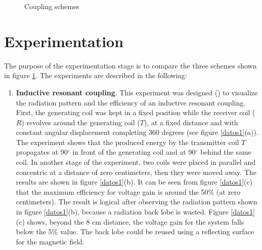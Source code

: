 \documentclass{intech}
\begin{document}
{\begin{figure}[htbp]	%
\centering
{} %
\hspace{0.5cm}
\hspace{0.5cm}
\vspace{-0.5cm}
\caption{Coupling schemes}
\label{fuerte}
\end{figure}

\section{Experimentation}
The purpose of the experimentation stage is to compare the three schemes shown in figure \ref{fuerte}. The experiments are described in the following:
\vspace{-0.3cm}
\begin{enumerate}
\item {\bf Inductive resonant coupling}. This experiment was designed (\cite{SOMI}) to visualize the radiation pattern and the efficiency of an inductive resonant coupling. First, the generating coil was kept in a fixed position while the receiver coil ($R$) revolves around the generating coil ($T$), at a fixed distance and with constant angular displacement completing 360 degrees (see figure \ref{datos1}(a)). The experiment shows that the produced energy by the transmitter coil $T$ propagates at 90$^\circ$ in front of the generating coil and at 90$^\circ$ behind the same coil. In another stage of the experiment, two coils were placed in parallel and concentric at a distance of zero centimeters, then they were moved away. The results are shown in figure \ref{datos1}(b). It can be seen from figure \ref{datos1}(c) that the maximum efficiency for voltage gain is around the 50\% (at zero centimeters). The result is logical after observing  the radiation pattern shown in figure \ref{datos1}(b), because a radiation back lobe is wasted. Figure \ref{datos1}(c) shows, beyond the 8 cm distance, the voltage gain for the system falls below the 5\% value. The back lobe could be reused using a reflecting surface for the magnetic field.


\end{enumerate}}
\end{document}
